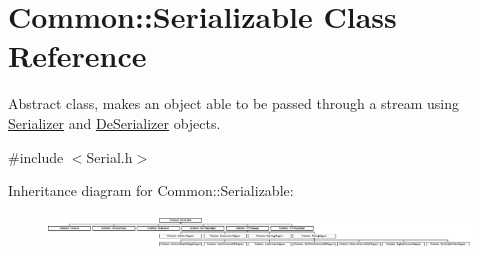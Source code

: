 \hypertarget{class_common_1_1_serializable}{\section{Common\-:\-:Serializable Class Reference}
\label{class_common_1_1_serializable}
}


Abstract class, makes an object able to be passed through a stream using \hyperlink{class_common_1_1_serializer}{Serializer} and \hyperlink{class_common_1_1_de_serializer}{De\-Serializer} objects.  




{\ttfamily \#include $<$Serial.\-h$>$}

Inheritance diagram for Common\-:\-:Serializable\-:\begin{figure}[H]
\begin{center}
\leavevmode
\includegraphics[height=0.906883cm]{class_common_1_1_serializable}
\end{center}
\end{figure}
